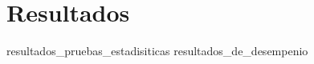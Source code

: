 %
%

\section{Resultados}
\label{sec:resultados}

{resultados_pruebas_estadisiticas}
{resultados_de_desempenio}
